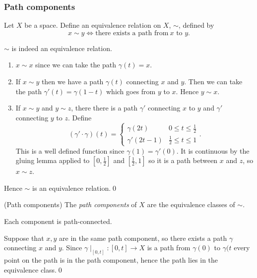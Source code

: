 \documentclass{article}
\begin{document}
\subsubsection{Path components}
Let $ X $  be a space. Define an equivalence relation on $ X $, $ \sim $, defined by
\[
	x\sim y\iff \text{there exists a path from}\ x \text{ to } y.
\]
\begin{lemma}
  $ \sim $ is indeed an equivalence relation.
\end{lemma}
\pf
\begin{enumerate}
	\item $ x\sim x $ since we can take the path $ \gamma(t) =x $.
	\item If $ x\sim y $ then we have a path $ \gamma(t) $ connecting $ x $ and $ y $. Then we can take the path $ \gamma'(t) = \gamma(1-t) $ which goes from $ y $ to $ x $. Hence $ y\sim x $.
	\item If $ x\sim y $ and $ y\sim z $, there there is a path $ \gamma' $ connecting $ x $ to $ y $ and $ \gamma' $ connecting $ y $ to $ z $. Define
		\[
			(\gamma'\cdot\gamma)(t) = \begin{cases}
				\gamma(2t) & 0\le t\le \frac 12 \\
				\gamma'(2t-1) & \frac 12 \le t \le 1
			\end{cases}.
		\]
		This is a well defined function since $ \gamma(1) = \gamma'(0) $. It is continuous by the gluing lemma applied to $ [0,\frac 12] $ and $ [\frac 12,1] $ so it is a path between $ x $ and $ z $, so $ x\sim z $. 
\end{enumerate}
Hence $ \sim $ is an equivalence relation.\qed
\begin{definition}
	(Path components) The \textit{path components} of $ X $ are the equivalence classes of $ \sim $.
\end{definition}
\begin{claim}
  Each component is path-connected.
\end{claim}
\pf Suppose that $ x,y $ are in the same path component, so there exists a path $ \gamma $ connecting $ x $ and $ y $. Since $ \gamma\mid_{[0,t]}:[0,t]\to X $ is a path from $ \gamma(0) $ to $ \gamma(t $ every point on the path is in the path component, hence the path lies in the equivalence class.\qed
\end{document}
